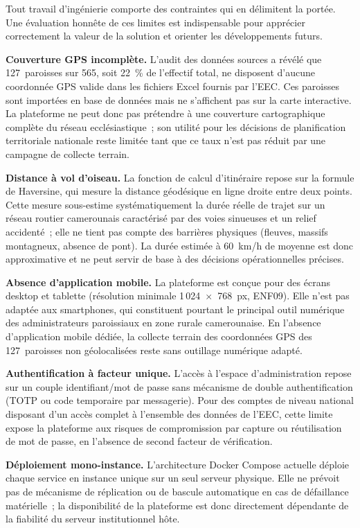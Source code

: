 Tout travail d'ingénierie comporte des contraintes qui en délimitent la
portée. Une évaluation honnête de ces limites est indispensable pour
apprécier correctement la valeur de la solution et orienter les
développements futurs.

\textbf{Couverture GPS incomplète.}
L'audit des données sources a révélé que 127~paroisses sur 565, soit
22~\% de l'effectif total, ne disposent d'aucune coordonnée GPS valide
dans les fichiers Excel fournis par l'EEC. Ces paroisses sont importées
en base de données mais ne s'affichent pas sur la carte interactive.
La plateforme ne peut donc pas prétendre à une couverture cartographique
complète du réseau ecclésiastique~; son utilité pour les décisions de
planification territoriale nationale reste limitée tant que ce taux
n'est pas réduit par une campagne de collecte terrain.

\textbf{Distance à vol d'oiseau.}
La fonction de calcul d'itinéraire repose sur la formule de Haversine,
qui mesure la distance géodésique en ligne droite entre deux points.
Cette mesure sous-estime systématiquement la durée réelle de trajet
sur un réseau routier camerounais caractérisé par des voies sinueuses
et un relief accidenté~; elle ne tient pas compte des barrières
physiques (fleuves, massifs montagneux, absence de pont).
La durée estimée à 60~km/h de moyenne est donc approximative et ne
peut servir de base à des décisions opérationnelles précises.

\textbf{Absence d'application mobile.}
La plateforme est conçue pour des écrans desktop et tablette
(résolution minimale 1\,024~$\times$~768~px, ENF09). Elle n'est pas
adaptée aux smartphones, qui constituent pourtant le principal outil
numérique des administrateurs paroissiaux en zone rurale camerounaise.
En l'absence d'application mobile dédiée, la collecte terrain des
coordonnées GPS des 127~paroisses non géolocalisées reste sans
outillage numérique adapté.

\textbf{Authentification à facteur unique.}
L'accès à l'espace d'administration repose sur un couple
identifiant/mot de passe sans mécanisme de double authentification
(TOTP ou code temporaire par messagerie). Pour des comptes de niveau
national disposant d'un accès complet à l'ensemble des données de
l'EEC, cette limite expose la plateforme aux risques de compromission
par capture ou réutilisation de mot de passe, en l'absence de second
facteur de vérification.

\textbf{Déploiement mono-instance.}
L'architecture Docker Compose actuelle déploie chaque service en
instance unique sur un seul serveur physique. Elle ne prévoit pas de
mécanisme de réplication ou de bascule automatique en cas de défaillance
matérielle~; la disponibilité de la plateforme est donc directement
dépendante de la fiabilité du serveur institutionnel hôte.

